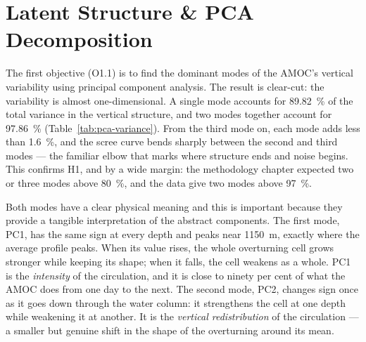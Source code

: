 \section{Latent Structure \& PCA Decomposition}
\label{sec:detect-pca}
 
The first objective (O1.1) is to find the dominant modes of the AMOC's vertical variability using principal component analysis. The result is clear-cut: the variability is almost one-dimensional. A single mode accounts for \SI{89.82}{\percent} of the total variance in the vertical structure, and two modes together account for \SI{97.86}{\percent} (Table~\ref{tab:pca-variance}). From the third mode on, each mode adds less than \SI{1.6}{\percent}, and the scree curve bends sharply between the second and third modes --- the familiar elbow that marks where structure ends and noise begins. This confirms H1, and by a wide margin: the methodology chapter expected two or three modes above \SI{80}{\percent}, and the data give two modes above \SI{97}{\percent}.
 


 
Both modes have a clear physical meaning and this is important because they provide a tangible interpretation of the abstract components. The first mode, PC1, has the same sign at every depth and peaks near 1150~m, exactly where the average profile peaks. When its value rises, the whole overturning cell grows stronger while keeping its shape; when it falls, the cell weakens as a whole. PC1 is the \emph{intensity} of the circulation, and it is close to ninety per cent of what the AMOC does from one day to the next. The second mode, PC2, changes sign once as it goes down through the water column: it strengthens the cell at one depth while weakening it at another. It is the \emph{vertical redistribution} of the circulation --- a smaller but genuine shift in the shape of the overturning around its mean.


 
